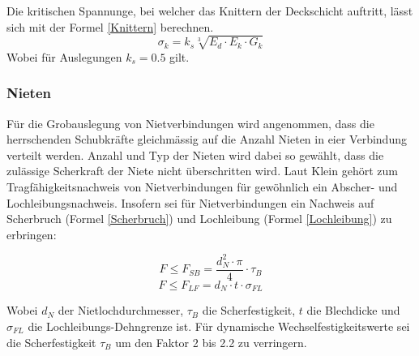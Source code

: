     Die kritischen Spannunge, bei welcher das Knittern der Deckschicht auftritt, lässt sich mit der Formel \ref{Knittern} berechnen. \cite{ETH}
    \begin{equation}
      \label{Knittern}
      \sigma_k = k_s\sqrt[3]{E_d \cdot E_k \cdot G_k}
    \end{equation}
    Wobei für Auslegungen \(k_s = 0.5\) gilt.


  \subsubsection{Nieten}
    Für die Grobauslegung von Nietverbindungen wird angenommen, dass die herrschenden Schubkräfte gleichmässig auf die Anzahl Nieten in eier Verbindung verteilt werden. Anzahl und Typ der Nieten wird dabei so gewählt, dass die zulässige Scherkraft der Niete nicht überschritten wird. Laut Klein \cite{klein} gehört zum Tragfähigkeitsnachweis von Nietverbindungen für gewöhnlich ein Abscher- und Lochleibungsnachweis. Insofern sei für Nietverbindungen ein Nachweis auf Scherbruch (Formel \ref{Scherbruch}) und Lochleibung (Formel \ref{Lochleibung}) zu erbringen:
    \begin{multicols}{2}
      \begin{equation}
        \label{Scherbruch}
        F \leq F_{SB} = \frac{d_N^2 \cdot \pi}{4}\cdot \tau_B
      \end{equation}\break
      \begin{equation}
        \label{Lochleibung}
        F \leq F_{LF} = d_N \cdot t \cdot \sigma_{FL}
      \end{equation}
    \end{multicols}
    Wobei $d_N$ der Nietlochdurchmesser, $\tau_B$ die Scherfestigkeit, $t$ die Blechdicke und $\sigma_{FL}$ die Lochleibungs-Dehngrenze ist. Für dynamische Wechselfestigkeitswerte sei die Scherfestigkeit $\tau_B$ um den Faktor 2 bis 2.2 zu verringern.


